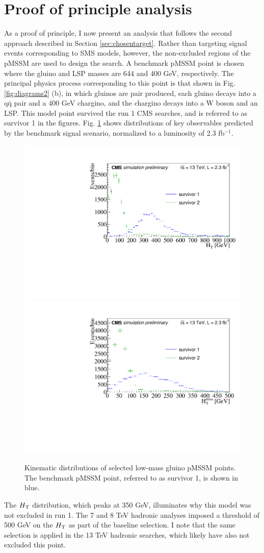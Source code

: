 \section{Proof of principle analysis}
\label{sec:lastbattle}
As a proof of principle, I now present an analysis that follows the second approach described in Section \ref{sec:chosentarget}. Rather than targeting signal events corresponding to SMS models, however, the non-excluded regions of the pMSSM are used to design the search. A benchmark pMSSM point is chosen where the gluino and LSP masses are 644 and 400 GeV, respectively. The principal physics process corresponding to this point is that shown in Fig. \ref{fig:diagrams2} (b), in which gluinos are pair produced, each gluino decays into a q$\bar{\text{q}}$ pair and a 400 GeV chargino, and the chargino decays into a W boson and an LSP. This model point survived the run 1 CMS searches, and is referred to as survivor 1 in the figures. Fig. \ref{fig:Survivors} shows distributions of key observables predicted by the benchmark signal scenario, normalized to a luminosity of 2.3 fb$^{-1}$. 
\begin{figure}[tb!]
\centering
\includegraphics[width=0.45\linewidth]{figures/SusySearches/MvaSusy/SurvivorsHt.pdf}
\includegraphics[width=0.45\linewidth]{figures/SusySearches/MvaSusy/SurvivorsMht.pdf}
\caption{Kinematic distributions of selected low-mass gluino pMSSM points. The benchmark pMSSM point, referred to as survivor 1, is shown in blue.}
\label{fig:Survivors}
\end{figure}
The $H_{\rm T}$ distribution, which peaks at 350 GeV, illuminates why this model was not excluded in run 1. The 7 and 8 TeV hadronic analyses imposed a threshold of 500 GeV on the $H_{\rm T}$ as part of the baseline selection. I note that the same selection is applied in the 13 TeV hadronic searches, which likely have also not excluded this point. 

